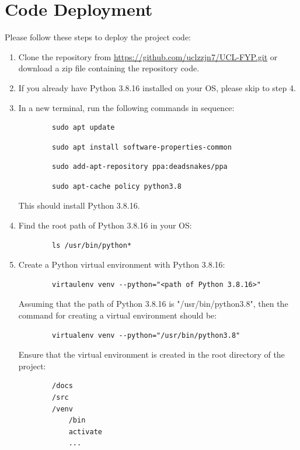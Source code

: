 \documentclass[11pt, a4paper]{report}
\begin{document}
\section{Code Deployment}\label{apdx:2.2}
Please follow these steps to deploy the project code:
\begin{enumerate}
    \item Clone the repository from \href{https://github.com/uclzzjn7/UCL-FYP.git}{https://github.com/uclzzjn7/UCL-FYP.git} or download a zip file containing the repository code.

    \item If you already have Python 3.8.16 installed on your OS, please skip to step 4.
    
    \item In a new terminal, run the following commands in sequence:
    \begin{lstlisting}
        sudo apt update
    \end{lstlisting}
    \begin{lstlisting}
        sudo apt install software-properties-common
    \end{lstlisting}
    \begin{lstlisting}
        sudo add-apt-repository ppa:deadsnakes/ppa
    \end{lstlisting}
    \begin{lstlisting}
        sudo apt-cache policy python3.8
    \end{lstlisting}
    This should install Python 3.8.16.

    \item Find the root path of Python 3.8.16 in your OS:
    \begin{lstlisting}
        ls /usr/bin/python*
    \end{lstlisting}

    \item Create a Python virtual environment with Python 3.8.16:
    \begin{lstlisting}
        virtaulenv venv --python="<path of Python 3.8.16>"
    \end{lstlisting}
    Assuming that the path of Python 3.8.16 is "/usr/bin/python3.8", then the command for creating a virtual environment should be:
    \begin{lstlisting}
        virtualenv venv --python="/usr/bin/python3.8"
    \end{lstlisting}
    Ensure that the virtual environment is created in the root directory of the project:
    \begin{lstlisting}
        /docs
        /src
        /venv
            /bin
            activate
            ...
    \end{lstlisting}


\end{enumerate}
\end{document}
